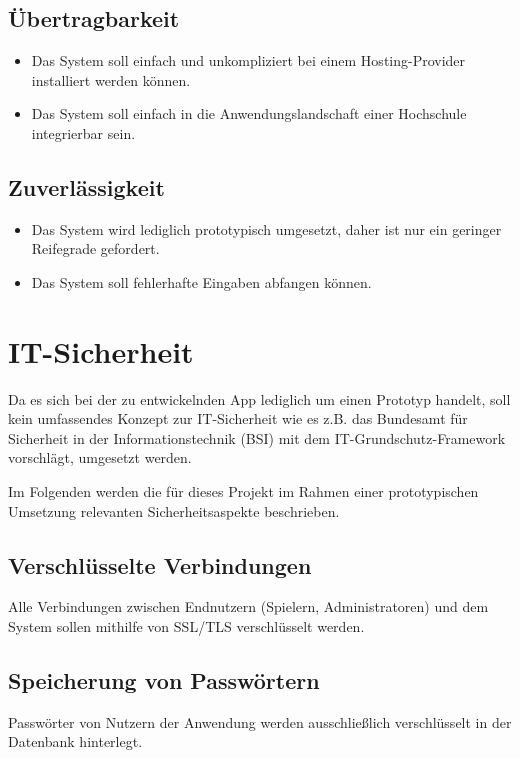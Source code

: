 \documentclass[a4paper,11pt,listof=numbered,glossary=totoc,parskip=half,toc=bib]{scrreprt}
\begin{document}
	\subsection{Übertragbarkeit}
	\begin{itemize}
		\item Das System soll einfach und unkompliziert bei einem Hosting-Provider installiert werden können.
		\item Das System soll einfach in die Anwendungslandschaft einer Hochschule integrierbar sein.
\end{itemize}		

	\subsection{Zuverlässigkeit}
	\begin{itemize}
		\item Das System wird lediglich prototypisch umgesetzt, daher ist nur ein geringer Reifegrade gefordert.
		\item Das System soll fehlerhafte Eingaben abfangen können.
	\end{itemize}
	
	\section{IT-Sicherheit}
	\label{sec:itsicherheit}
	
	Da es sich bei der zu entwickelnden App lediglich um einen Prototyp handelt, soll kein umfassendes Konzept zur IT-Sicherheit wie es z.B. das Bundesamt für Sicherheit in der Informationstechnik (BSI) mit dem IT-Grundschutz-Framework vorschlägt, umgesetzt werden.
	
	Im Folgenden werden die für dieses Projekt im Rahmen einer prototypischen Umsetzung relevanten Sicherheitsaspekte beschrieben.
	
	\subsection{Verschlüsselte Verbindungen}
	Alle Verbindungen zwischen Endnutzern (Spielern, Administratoren) und dem System sollen mithilfe von SSL/TLS verschlüsselt werden.
	

	\subsection{Speicherung von Passwörtern}
	Passwörter von Nutzern der Anwendung werden ausschließlich verschlüsselt in der Datenbank hinterlegt.
	
\end{document}
